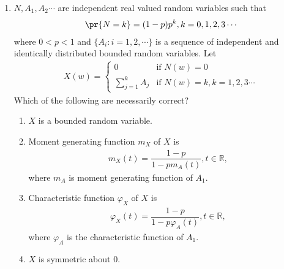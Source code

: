 \renewcommand{\theequation}{\theenumi}
\renewcommand{\thefigure}{\theenumi}
\begin{enumerate}[label=\thesection.\arabic*.,ref=\thesection.\theenumi]

\item  $N,A_1,A_2\cdots$ are independent real valued random variables such that 
    \begin{align}
        \pr{N=k}=(1-p)p^k,k=0,1,2,3\cdots
    \end{align}
    where $0<p<1$ and $\{A_i:i=1,2,\cdots\}$ is a sequence of independent and identically distributed bounded random variables. Let 
    \begin{align}
        X(w) = 
        \begin{cases}
        0  & \text{if } N(w)=0\\
        \sum_{j=1}^{k} A_j & \text{if } N(w)=k,k=1,2,3\cdots 
        \end{cases}
    \end{align}
    Which of the following are necessarily correct?\\
    \begin{enumerate}
        \item $X$ is a bounded random variable. 
        \item Moment generating function $m_X$ of $X$ is
        \begin{align}
            m_X(t)=\dfrac{1-p}{1-pm_A(t)}, t\in \mathbb{R},
        \end{align}
        where $m_A$ is moment generating function of $A_1$.
        \item Characteristic function $\varphi_X$ of $X$ is
        \begin{align}
            \varphi_X(t)=\dfrac{1-p}{1-p\varphi_A(t)},t\in \mathbb{R},
        \end{align}
        where $\varphi_A$ is the characteristic function of $A_1$.
        \item $X$ is symmetric about 0.
    \end{enumerate}



\end{enumerate}
